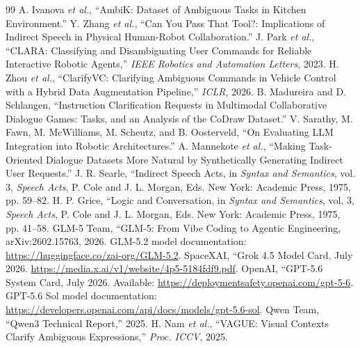 \documentclass[10pt,conference]{IEEEtran}
\begin{document}
\begin{thebibliography}{99}
 A. Ivanova \emph{et al.}, ``AmbiK: Dataset of Ambiguous Tasks in Kitchen Environment.''
 Y. Zhang \emph{et al.}, ``Can You Pass That Tool?: Implications of Indirect Speech in Physical Human-Robot Collaboration.''
 J. Park \emph{et al.}, ``CLARA: Classifying and Disambiguating User Commands for Reliable Interactive Robotic Agents,'' \emph{IEEE Robotics and Automation Letters}, 2023.
 H. Zhou \emph{et al.}, ``ClarifyVC: Clarifying Ambiguous Commands in Vehicle Control with a Hybrid Data Augmentation Pipeline,'' \emph{ICLR}, 2026.
 B. Madureira and D. Schlangen, ``Instruction Clarification Requests in Multimodal Collaborative Dialogue Games: Tasks, and an Analysis of the CoDraw Dataset.''
 V. Sarathy, M. Fawn, M. McWilliams, M. Scheutz, and B. Oosterveld, ``On Evaluating LLM Integration into Robotic Architectures.''
 A. Mannekote \emph{et al.}, ``Making Task-Oriented Dialogue Datasets More Natural by Synthetically Generating Indirect User Requests.''
 J. R. Searle, ``Indirect Speech Acts, in \emph{Syntax and Semantics}, vol. 3, \emph{Speech Acts}, P. Cole and J. L. Morgan, Eds. New York: Academic Press, 1975, pp. 59--82.
 H. P. Grice, ``Logic and Conversation, in \emph{Syntax and Semantics}, vol. 3, \emph{Speech Acts}, P. Cole and J. L. Morgan, Eds. New York: Academic Press, 1975, pp. 41--58.
 GLM-5 Team, ``GLM-5: From Vibe Coding to Agentic Engineering, arXiv:2602.15763, 2026. GLM-5.2 model documentation: \url{https://huggingface.co/zai-org/GLM-5.2}.
 SpaceXAI, ``Grok 4.5 Model Card, July 2026. \url{https://media.x.ai/v1/website/4p5-5184fdf9.pdf}.
 OpenAI, ``GPT-5.6 System Card, July 2026. Available: \url{https://deploymentsafety.openai.com/gpt-5-6}. GPT-5.6 Sol model documentation: \url{https://developers.openai.com/api/docs/models/gpt-5.6-sol}.
 Qwen Team, ``Qwen3 Technical Report,'' 2025.
 H. Nam \emph{et al.}, ``VAGUE: Visual Contexts Clarify Ambiguous Expressions,'' \emph{Proc. ICCV}, 2025.
\end{thebibliography}
\end{document}
